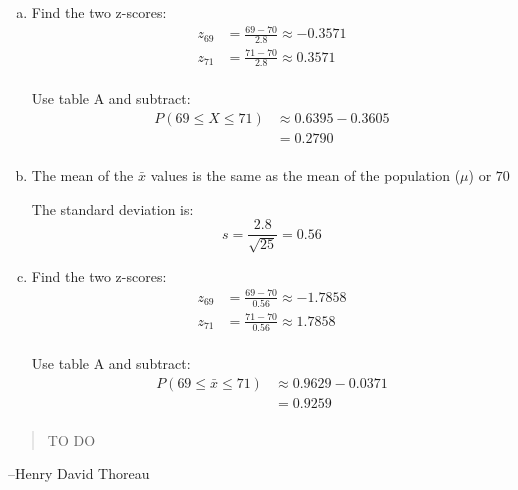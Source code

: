 \documentclass[letterpaper, landscape]{exam}
\begin{document}
\begin{description}
        \begin{enumerate}[(a)]
          \item Find the two z-scores:
            \begin{align*}
              z_{69} &= \frac{69 - 70}{2.8} \approx -0.3571 \\
              z_{71} &= \frac{71 - 70}{2.8} \approx 0.3571 \\
            \end{align*}

            Use table A and subtract:
            \begin{align*}
              P(69 \leq X \leq 71) & \approx 0.6395 - 0.3605 \\
                                   & = \boxed{ 0.2790 } \\
            \end{align*}

          \item 
            The mean of the $\bar{x}$ values is the same as the mean of the
            population ($\mu$) or $\boxed{ 70 }$

            The standard deviation is:
            \[
              s = \frac{2.8}{\sqrt{25}} = \boxed{ 0.56 }
            \]

          \item Find the two z-scores:
            \begin{align*}
              z_{69} &= \frac{69 - 70}{0.56} \approx -1.7858 \\
              z_{71} &= \frac{71 - 70}{0.56} \approx 1.7858 \\
            \end{align*}

            Use table A and subtract:
            \begin{align*}
              P(69 \leq \bar{x} \leq 71) & \approx 0.9629 - 0.0371 \\
                                         & = \boxed{ 0.9259 } \\
            \end{align*}

        \end{enumerate}
  \end{description}

  \else
    \vspace{10 cm}
    \begin{quote}
      \begin{em}
        TO DO
      \end{em}
    \end{quote}
    \hspace{1 cm} --Henry David Thoreau
  \fi
\end{document}
